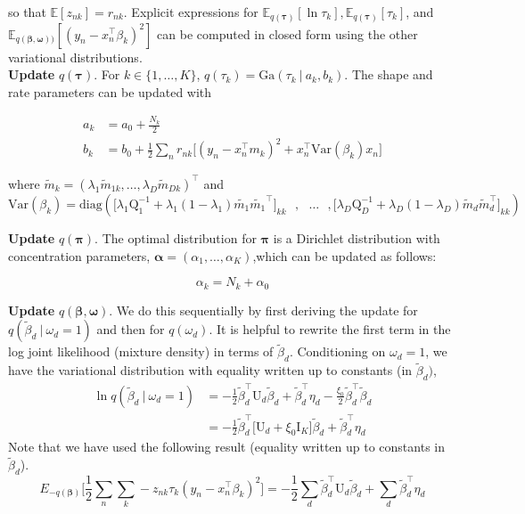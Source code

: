 \documentclass[twoside,11pt]{article}
\newcommand{\tr}{\intercal}
\newcommand\given[1][]{\:#1\vert\:}
\newcommand{\transpose}[1]{#1^{\intercal}}
\newcommand{\nsum}{\sum\limits_{n}}
\newcommand{\ksum}{\sum\limits_{k}}
\newcommand{\boldbeta}{\boldsymbol\beta}
\newcommand{\boldomega}{\boldsymbol\omega}
\newcommand{\boldtau}{\boldsymbol\tau}
\newcommand{\boldpi}{\boldsymbol\pi}
\newcommand{\E}{\mathbb{E}}
\newcommand{\betad}{\tilde{\beta}_d}
\newcommand{\umat}{\mathrm{U}}
\newcommand{\qmat}{\mathrm{Q}}
\newcommand{\var}[1]{\mathrm{Var}\left(#1\right)}
\begin{document}
so that $\E[z_{nk}] = r_{nk}$. Explicit expressions for $\E_{q(\boldsymbol\tau)}[ \ln \tau_k ], \E_{q(\boldsymbol\tau)}[\tau_k]$, and $\E_{q(\boldbeta, \boldsymbol\omega))}[(y_n - x_n^{\tr}\beta_k)^2]$ can be computed in closed form using the other variational distributions. \\

\textbf{Update} $q(\boldtau)$. For $k \in \{1, \ldots, K \}$, $q(\tau_k) = \mathrm{Ga}\left( \tau_k \given a_k, b_k \right)$. The shape and rate parameters can be updated with

\begin{align}
	a_k &= a_0 + \frac{N_k}{2} \label{eq:ak_vs_indep} \\
	b_k &= b_0 + \frac{1}{2} \nsum r_{nk} \bigg[ (y_n -\transpose{x_n} m_k)^2 + \transpose{x_n}\var{\beta_k} x_n \bigg] \label{eq:bk_vs_dep}
\end{align}

where $\tilde{m}_k = \transpose{\left( \lambda_1 \tilde{m}_{1k}, \ldots, \lambda_D \tilde{m}_{Dk} \right)}$ and $$\var{\beta_k} = \mathrm{diag} \left( \Big[ \lambda_1 \qmat_1^{-1} + \lambda_1(1 - \lambda_1) \tilde{m_1} \transpose{\tilde{m_1}}\Big]_{kk} \textrm{ }, \textrm{ }\ldots\textrm{ }, \Big[ \lambda_D \qmat_D^{-1} + \lambda_D(1 - \lambda_D) \tilde{m}_d \transpose{\tilde{m}_d}\Big]_{kk} \right)$$ 


\textbf{Update} $q(\boldsymbol \pi)$. The optimal distribution for $\boldpi$ is a Dirichlet distribution with concentration parameters, $\boldsymbol \alpha = (\alpha_1, \ldots, \alpha_K)$,which can be updated as follows:

\begin{equation} \label{eq:alpha}
	\alpha_k = N_k + \alpha_0
\end{equation}


\textbf{Update} $q(\boldbeta, \boldomega)$. We do this sequentially by first deriving the update for $q\left(\betad \given \omega_d = 1 \right)$ and then for $q\left( \omega_d \right)$. It is helpful to rewrite the first term in the log joint likelihood (mixture density) in terms of $\betad$. Conditioning on $\omega_d = 1$, we have the variational distribution with equality written up to constants (in $\betad)$, 
\begin{align}
	 \ln q\left(\betad \given \omega_d = 1 \right) &= - \frac{1}{2} \transpose{\betad} \umat_d \betad + \transpose{\betad} \eta_d - \frac{\xi_0}{2} \transpose{\betad} \betad \\
	 &= - \frac{1}{2} \transpose{\betad} \big[ \umat_d +  \xi_0 \mathrm{I}_K\big] \betad + \transpose{\betad} \eta_d \label{eq:ln_q_beta_vs}
\end{align}
Note that we have used the following result (equality written up to constants in $\betad$). 
\begin{equation}
	 E_{-q(\boldbeta)} \Bigg[ \frac{1}{2} \nsum \ksum -z_{nk} \tau_k \left( y_n - \transpose{x_n} \beta_k \right)^2 \Bigg] = - \frac{1}{2} \sum_d \transpose{\betad} \umat_d \betad + \sum_{d} \transpose{\betad} \eta_d
\end{equation}
\end{document}
